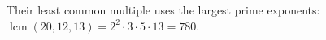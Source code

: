 Their least common multiple uses the largest prime exponents: $\operatorname{lcm}(20,12,13)=2^2\cdot3\cdot5\cdot13=\boxed{780}$.
